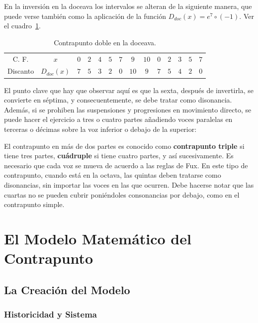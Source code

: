 \documentclass[letterpaper,12pt]{book}
\theoremstyle{definition} \newtheorem{Def}{Definición}[chapter]
\theoremstyle{definition} \newtheorem{Teo}{Teorema}[chapter]
\theoremstyle{definition} \newtheorem{Pro}{Proposición}[chapter]
\theoremstyle{definition} \newtheorem{Lema}{Lema}[chapter]
\begin{document}
En la inversión en la doceava los intervalos se alteran de la siguiente manera, que puede verse también como la aplicación de la función $D_{doc}(x)=e^7 \circ (-1)$. Ver el cuadro~\ref{CuadroDoble12}.

\begin{table}[h]
\centering
\begin{tabular}{|c c c c c c c c c c c c c c|}
\hline
C. F. & $x$ & $0$ & $2$ & $4$ & $5$ & $7$ & $9$ & $10$ & $0$ & $2$ & $3$ & $5$ & $7$\\
Discanto & $D_{doc}(x)$ & $7$ & $5$ & $3$ & $2$ & $0$ & $10$ & $9$ & $7$ & $5$ & $4$ & $2$ & $0$\\ 
\hline
\end{tabular}
\caption{\label{CuadroDoble12}Contrapunto doble en la doceava.} 
\end{table}

El punto clave que hay que observar aquí es que la sexta, después de invertirla, se convierte en séptima, y consecuentemente, se debe tratar como disonancia. Además, si se prohiben las suspensiones y progresiones en movimiento directo, se puede hacer el ejercicio a tres o cuatro partes añadiendo voces paralelas en terceras o décimas sobre la voz inferior o debajo de la superior:

El contrapunto en más de dos partes es conocido como  \textbf{contrapunto triple} si tiene tres partes,  \textbf{cuádruple} si tiene cuatro partes, y así sucesivamente. Es necesario que cada voz se mueva de acuerdo a las reglas de Fux. En este tipo de contrapunto, cuando está en la octava, las quintas deben tratarse como disonancias, sin importar las voces en las que ocurren. Debe hacerse notar que las cuartas no se pueden cubrir poniéndoles consonancias por debajo, como en el contrapunto simple.   

\chapter{El Modelo Matemático del Contrapunto}

\section{La Creación del Modelo}

\subsection{Historicidad y Sistema}
\end{document}
